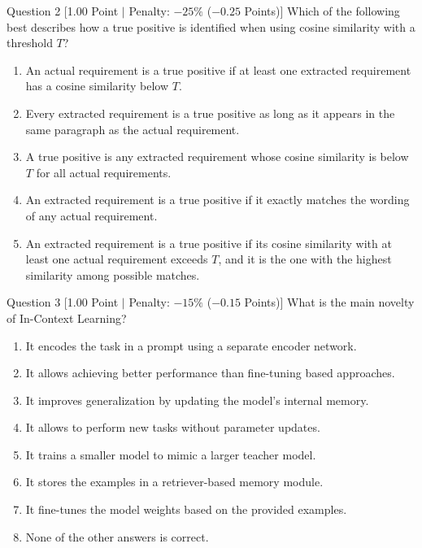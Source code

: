 \documentclass[11pt,a4paper]{article}
\begin{document}
\begin{questionbox}{Question 2 \hfill [1.00 Point $\vert$ Penalty: $-25\%$ ($-0.25$ Points)]}
Which of the following best describes how a true positive is identified when using cosine similarity with a threshold $T$?

\begin{enumerate}[label=\alph*.,leftmargin=2em]
    \item An actual requirement is a true positive if at least one extracted requirement has a cosine similarity below $T$.
    \item Every extracted requirement is a true positive as long as it appears in the same paragraph as the actual requirement.
    \item A true positive is any extracted requirement whose cosine similarity is below $T$ for all actual requirements.
    \item An extracted requirement is a true positive if it exactly matches the wording of any actual requirement.
    \item An extracted requirement is a true positive if its cosine similarity with at least one actual requirement exceeds $T$, and it is the one with the highest similarity among possible matches.
\end{enumerate}
\end{questionbox}

\newpage

\begin{questionbox}{Question 3 \hfill [1.00 Point $\vert$ Penalty: $-15\%$ ($-0.15$ Points)]}
What is the main novelty of In-Context Learning?

\begin{enumerate}[label=\alph*.,leftmargin=2em]
    \item It encodes the task in a prompt using a separate encoder network.
    \item It allows achieving better performance than fine-tuning based approaches.
    \item It improves generalization by updating the model's internal memory.
    \item It allows to perform new tasks without parameter updates.
    \item It trains a smaller model to mimic a larger teacher model.
    \item It stores the examples in a retriever-based memory module.
    \item It fine-tunes the model weights based on the provided examples.
    \item None of the other answers is correct.
\end{enumerate}
\end{questionbox}
\end{document}
